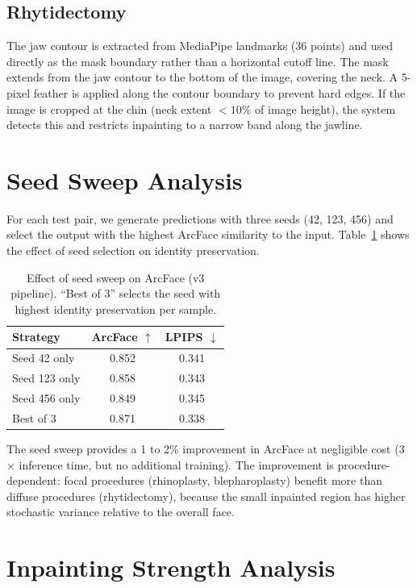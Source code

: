 \documentclass[10pt,twocolumn,letterpaper]{article}
\begin{document}
\subsection{Rhytidectomy}

The jaw contour is extracted from MediaPipe landmarks (36 points) and
used directly as the mask boundary rather than a horizontal cutoff line.
The mask extends from the jaw contour to the bottom of the image,
covering the neck. A 5-pixel feather is applied along the contour
boundary to prevent hard edges. If the image is cropped at the chin
(neck extent $< 10\%$ of image height), the system detects this and
restricts inpainting to a narrow band along the jawline.

\section{Seed Sweep Analysis}

For each test pair, we generate predictions with three seeds (42, 123,
456) and select the output with the highest ArcFace similarity to the
input. Table~\ref{tab:seed_sweep} shows the effect of seed selection
on identity preservation.

\begin{table}[H]
\centering
\caption{Effect of seed sweep on ArcFace (v3 pipeline). ``Best of 3''
selects the seed with highest identity preservation per sample.}
\label{tab:seed_sweep}
\begin{tabular}{@{}lcc@{}}
\toprule
\textbf{Strategy} & \textbf{ArcFace} $\uparrow$ & \textbf{LPIPS} $\downarrow$ \\
\midrule
Seed 42 only      & 0.852 & 0.341 \\
Seed 123 only     & 0.858 & 0.343 \\
Seed 456 only     & 0.849 & 0.345 \\
Best of 3         & 0.871 & 0.338 \\
\bottomrule
\end{tabular}
\end{table}

The seed sweep provides a 1 to 2\% improvement in ArcFace at negligible
cost (3$\times$ inference time, but no additional training). The
improvement is procedure-dependent: focal procedures (rhinoplasty,
blepharoplasty) benefit more than diffuse procedures (rhytidectomy),
because the small inpainted region has higher stochastic variance
relative to the overall face.

\section{Inpainting Strength Analysis}
\end{document}
